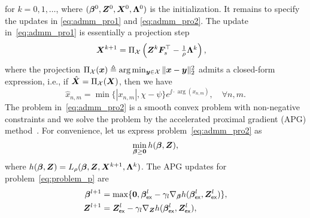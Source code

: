 \documentclass[10pt,twocolumn,twoside]{IEEEtran}
\begin{document}
for $k=0,1,\dots$, where $(\bm \beta^0,{\bm Z}^0,{\bm X}^0, \bm \Lambda^0)$ is the initialization.
It remains to specify the updates in \eqref{eq:admm_pro1} and \eqref{eq:admm_pro2}.
The update in~\eqref{eq:admm_pro1} is essentially a projection step
\begin{align*}
	{\bm X}^{k+1} &= \Pi_{\mathcal{X}} \left( {\bm Z}^{k} {\bm F}_s^\top -  \textstyle \frac{1}{\rho} \bm \Lambda^{k}\right),
\end{align*}
where the projection $\Pi_{\mathcal{X}}({\bm x}) \triangleq \arg\min_{{\bm y}\in \mathcal{X}}\| {\bm x} -{\bm y} \|_2^2$ admits a closed-form expression, i.e., if $\hat {{\bm X}} = \Pi_{\mathcal{X}}({\bm X})$, then we have
\[
\hat x_{n,m} = \min\{ |x_{n,m}|, \chi - \psi \} e^{\jj \cdot \arg(x_{n,m})}, \quad \forall n,m.
\]
The problem in~\eqref{eq:admm_pro2} is a smooth convex problem with non-negative constraints and we solve the problem by the accelerated proximal gradient (APG) method~\cite{beck2017first}.
For convenience, let us express problem~\eqref{eq:admm_pro2} as
\begin{equation}\label{eq:problem_p}
	\min_{\bm \beta \ge \bm 0} h(\bm \beta, {\bm Z}),
\end{equation}
where $h(\bm \beta, {\bm Z}) = L_{\rho}(\bm \beta,{\bm Z},{\bm X}^{k+1}, \bm \Lambda^{k})$.
The APG updates for problem~\eqref{eq:problem_p} are
\begin{equation}\label{eq:apg}
	\begin{split}
        \bm \beta^{l+1} &= \max\{ \bm 0, \bm \beta_{\sf ex}^l - \gamma_l \nabla_{\bm \beta}h(\bm \beta_{\sf ex}^l, {\bm Z}_{\sf ex}^l) \}, \\
        {\bm Z}^{l+1} &= {\bm Z}_{\sf ex}^l - \gamma_l \nabla_{{\bm Z}}h(\bm \beta_{\sf ex}^l, {\bm Z}_{\sf ex}^l), \\
	\end{split}
\end{equation}
\end{document}
